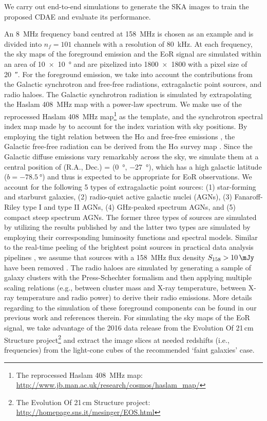\documentclass[fleqn,usenatbib]{mnras}
\newcommand{\editwip}[1]{{\leavevmode\color{magenta}#1}}
\begin{document}
We carry out end-to-end simulations to generate the SKA images to
train the proposed CDAE and evaluate its performance.
\editwip{%
An \SI{8}{\MHz} frequency band centred at \SI{158}{\MHz} is chosen as
an example and is divided into $n_f = 101$ channels with a resolution of
\SI{80}{\kHz}.
At each frequency, the sky maps of the foreground emission and the EoR
signal are simulated within an area of \SI{10 x 10}{\degree} and are
pixelized into \num{1800 x 1800} with a pixel size of \SI{20}{\arcsecond}.
For the foreground emission, we take into account the contributions from
the Galactic synchrotron and free-free radiations, extragalactic point
sources, and radio haloes.
The Galactic synchrotron radiation is simulated by extrapolating the Haslam
\SI{408}{\MHz} map with a power-law spectrum.  We make use of the
reprocessed Haslam \SI{408}{\MHz} map\footnote{%
  The reprocessed Haslam \SI{408}{\MHz} map:
  \url{http://www.jb.man.ac.uk/research/cosmos/haslam_map/}}
\citep{remazeilles2015} as the template, and the synchrotron spectral index
map made by \citet{giardino2002} to account for the index variation with
sky positions.
By employing the tight relation between the H$\alpha$ and free-free
emissions \citep[see][and references therein]{dickinson2003}, the Galactic
free-free radiation can be derived from the H$\alpha$ survey map
\citep{finkbeiner2003}.
Since the Galactic diffuse emissions vary remarkably across the sky, we
simulate them at a central position of (R.A., Dec\@.) = (\SI{0}{\degree},
\SI{-27}{\degree}), which has a high galactic latitude
($b = \SI{-78.5}{\degree}$) and thus is expected to be appropriate for
EoR observations.
We account for the following 5 types of extragalactic point sources:
(1) star-forming and starburst galaxies, (2) radio-quiet active galactic
nuclei (AGNs), (3) Fanaroff-Riley type I and type II AGNs, (4) GHz-peaked
spectrum AGNs, and (5) compact steep spectrum AGNs.
The former three types of sources are simulated by utilizing the results
published by \citet{wilman2008} and the latter two types are simulated by
employing their corresponding luminosity functions and spectral models.
Similar to the real-time peeling of the brightest point sources in
practical data analysis pipelines \citep[e.g.,][]{mitchell2008,intema2009},
we assume that sources with a \SI{158}{\MHz} flux density
$S_{158} > \SI{10}{\mJy}$ have been removed \citep[e.g.,][]{liu2009ps}.
The radio haloes are simulated by generating a sample of galaxy clusters
with the Press-Schechter formalism \citep{press1974} and then applying
multiple scaling relations (e.g., between cluster mass and X-ray
temperature, between X-ray temperature and radio power) to derive their
radio emissions.
More details regarding to the simulation of these foreground components can
be found in our previous work \citep{wang2010} and references therein.
For simulating the sky maps of the EoR signal, we take advantage of the
2016 data release from the Evolution Of 21\,cm Structure project\footnote{%
  The Evolution Of 21\,cm Structure project:
  \url{http://homepage.sns.it/mesinger/EOS.html}}
\citep{mesinger2016} and extract the image slices at needed redshifts
(i.e., frequencies) from the light-cone cubes of the recommended `faint
galaxies' case.

}
\end{document}
